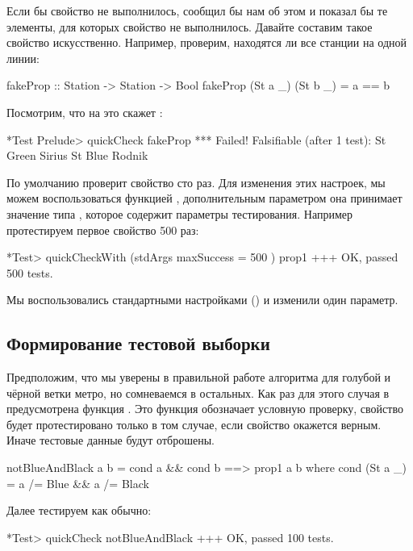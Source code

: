 Если бы свойство не выполнилось, 
сообщил бы нам об этом и показал бы те элементы,
для которых свойство не выполнилось. Давайте составим
такое свойство искусственно. Например, проверим, 
находятся ли все станции на одной линии:

\begin{code}
fakeProp :: Station -> Station -> Bool
fakeProp (St a _) (St b _) = a == b
\end{code}

Посмотрим, что на это скажет :

\begin{code}
*Test Prelude> quickCheck fakeProp
*** Failed! Falsifiable (after 1 test):  
St Green Sirius
St Blue Rodnik
\end{code}

По умолчанию  проверит свойство сто раз.
Для изменения этих настроек, мы можем воспользоваться функцией
, дополнительным параметром она принимает 
значение типа , которое содержит параметры тестирования.
Например протестируем первое свойство 500 раз:

\begin{code}
*Test> quickCheckWith (stdArgs{ maxSuccess = 500 }) prop1
+++ OK, passed 500 tests.
\end{code}

Мы воспользовались стандартными настройками () и изменили 
один параметр. 


\subsection{Формирование тестовой выборки}

Предположим, что мы уверены в правильной работе 
алгоритма для голубой и чёрной ветки метро, но сомневаемся
в остальных. Как раз для этого случая в 
предусмотрена функция . Это функция обозначает
условную проверку, свойство  будет протестировано
только в том  случае, если свойство  окажется
верным. Иначе тестовые данные будут отброшены.

\begin{code}
notBlueAndBlack a b = cond a && cond b ==> prop1 a b 
    where cond (St a _) = a /= Blue && a /= Black
\end{code}

Далее тестируем как обычно:

\begin{code}
*Test> quickCheck notBlueAndBlack 
+++ OK, passed 100 tests.
\end{code}

